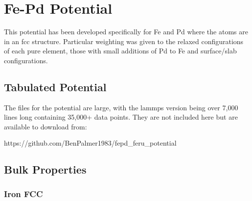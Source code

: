 \chapter{Fe-Pd Potential}
\label{chapter:appendix-fepdpotential}

This potential has been developed specifically for Fe and Pd where the atoms are in an \acrshort{fcc} structure.  Particular weighting was given to the relaxed configurations of each pure element, those with small additions of Pd to Fe and surface/slab configurations.

\section{Tabulated Potential}

The files for the potential are large, with the \acrshort{lammps} version being over 7,000 lines long containing 35,000+ data points.  They are not included here but are available to download from:

https://github.com/BenPalmer1983/fepd\_feru\_potential


\section{Bulk Properties}

\subsection{Iron FCC}

